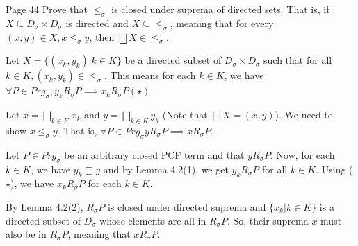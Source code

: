 \begin{problem}{Page 44}
Prove that $\leq_\sigma$ is closed under suprema of directed sets. That is, if 
$X \subseteq D_\sigma \times D_\sigma$ is directed and $X \subseteq \leq_\sigma$, meaning that for every $(x,y) \in X, x \leq_\sigma y$, then $\bigsqcup X \in \leq_\sigma$.
\end{problem}



\begin{solution}
    Let $X = \{ (x_k, y_k) | k \in K \}$ be a directed subset of $D_\sigma \times D_\sigma$ such that for all $k \in K, (x_k, y_k) \in \leq_\sigma$.
This means for each $k \in K$, we have $\forall P \in Prg_\sigma, y_k R_\sigma P \implies x_k R_\sigma P (\star)$.

Let $x = \bigsqcup_{k \in K} x_k$ and $y = \bigsqcup_{k \in K} y_k$ (Note that $\bigsqcup X = (x,y)$). We need to show $x \leq_\sigma y$. That is, $\forall P \in Prg_\sigma y R_\sigma P \implies x R_\sigma P$.

Let $P \in Prg_\sigma$ be an arbitrary closed PCF term and that $y R_\sigma P$. 
Now, for each $k \in K$, we have $y_k \sqsubseteq y$ and by Lemma 4.2(1), we get $y_k R_\sigma P$ for all $k \in K$. Using ($\star$), we have $x_k R_\sigma P$ for each $k \in K$. 

By Lemma 4.2(2), $R_\sigma P$ is closed under directed suprema and $\{ x_k | k \in K \}$ is a directed subset of $D_\sigma$ whose elements are all in $R_\sigma P$. So, their suprema $x$ must also be in $R_\sigma P$, meaning that $x R_\sigma P$.
\end{solution}